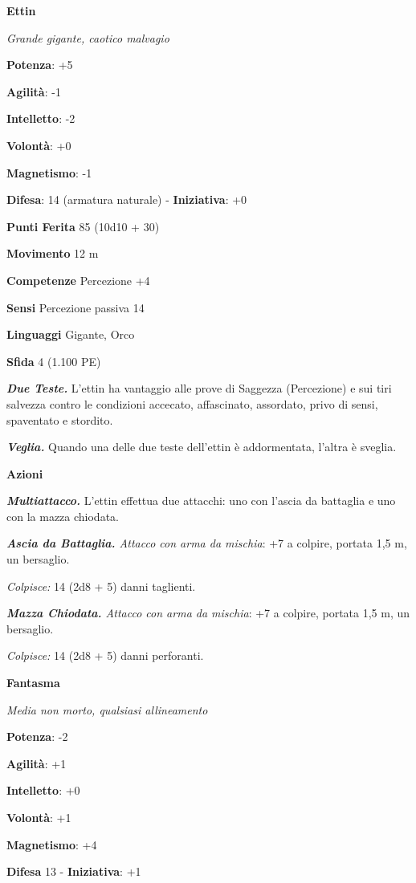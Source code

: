 \begin{multicols}{2}
\textbf{Ettin}

\emph{Grande gigante, caotico malvagio}

\textbf{Potenza}: +5

\textbf{Agilità}: -1

\textbf{Intelletto}: -2

\textbf{Volontà}: +0

\textbf{Magnetismo}: -1

\textbf{Difesa}: 14 (armatura naturale) - \textbf{Iniziativa}: +0

\textbf{Punti Ferita} 85 (10d10 + 30)

\textbf{Movimento} 12 m

\textbf{Competenze} Percezione +4

\textbf{Sensi} Percezione passiva 14

\textbf{Linguaggi} Gigante, Orco

\textbf{Sfida} 4 (1.100 PE)

\emph{\textbf{Due Teste.}} L'ettin ha vantaggio alle prove di Saggezza
(Percezione) e sui tiri salvezza contro le condizioni accecato,
affascinato, assordato, privo di sensi, spaventato e stordito.

\emph{\textbf{Veglia.}} Quando una delle due teste dell'ettin è
addormentata, l'altra è sveglia.

\textbf{Azioni}

\emph{\textbf{Multiattacco.}} L'ettin effettua due attacchi: uno con
l'ascia da battaglia e uno con la mazza chiodata.

\emph{\textbf{Ascia da Battaglia.} Attacco con arma da mischia}: +7 a
colpire, portata 1,5 m, un bersaglio.

\emph{Colpisce:} 14 (2d8 + 5) danni taglienti.

\emph{\textbf{Mazza Chiodata.} Attacco con arma da mischia}: +7 a
colpire, portata 1,5 m, un bersaglio.

\emph{Colpisce:} 14 (2d8 + 5) danni perforanti.

\textbf{Fantasma}

\emph{Media non morto, qualsiasi allineamento}

\textbf{Potenza}: -2

\textbf{Agilità}: +1

\textbf{Intelletto}: +0

\textbf{Volontà}: +1

\textbf{Magnetismo}: +4

\textbf{Difesa} 13 - \textbf{Iniziativa}: +1


\end{multicols}
